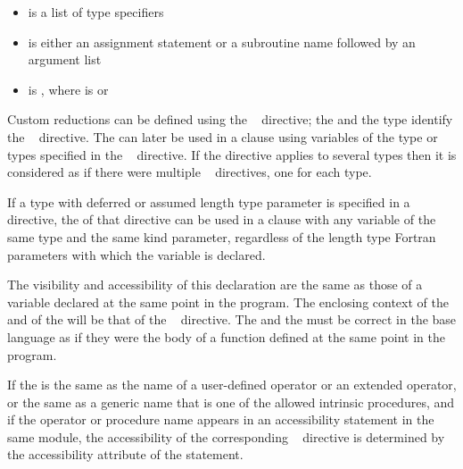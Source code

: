 {{{{\begin{itemize}
\item {} is a list of type specifiers 

\item {} is either an assignment statement or a subroutine name followed by an 
argument list 

\item {} is \code{)}, 
where  is\linebreak
{} or \code{(}\code{)}
\end{itemize}
\fortranspecificend

\descr
Custom reductions can be defined using the ~ directive; the 
 and the type identify the ~ directive. The 
 can later be used in a  clause using variables of the 
type or types specified in the ~ directive. If the directive applies 
to several types then it is considered as if there were multiple ~ 
directives, one for each type.

\fortranspecificstart
If a type with deferred or assumed length type parameter is specified in a ~ directive, the  of that directive can be used in a  clause with any variable of the same type and the same kind parameter, regardless of the length type Fortran parameters with which the variable is declared.
\fortranspecificend

The visibility and accessibility of this declaration are the same as those of a variable 
declared at the same point in the program. The enclosing context of the  and of 
the  will be that of the ~ directive. The  
and the  must be correct in the base language as if they were the body of 
a function defined at the same point in the program.

\fortranspecificstart
If the  is the same as the name of a user-defined operator or an extended operator, or the same as a generic name that is one of the allowed intrinsic procedures, and if the operator or procedure name appears in an accessibility statement in the same module, the accessibility of the corresponding ~ directive is determined by the accessibility attribute of the statement.

}}}}
